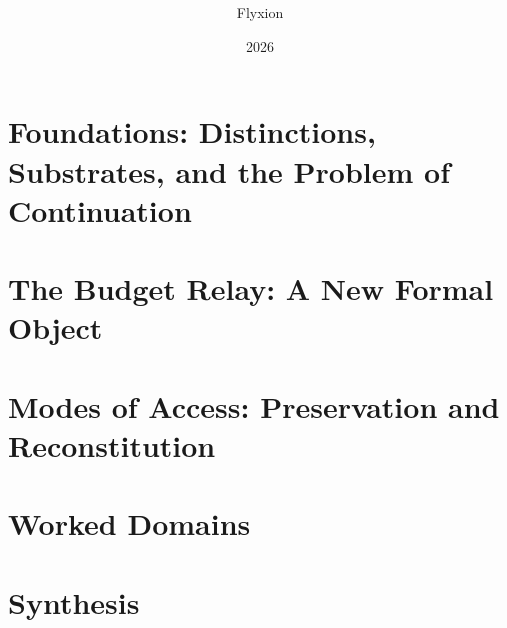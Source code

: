 \documentclass[11pt,twoside,openright]{book}
\title{\booktitle\\\large \booksubtitle}
\author{Flyxion}
\date{2026}
\begin{document}
\frontmatter
\maketitle




\tableofcontents

\mainmatter

\part{Foundations: Distinctions, Substrates, and the Problem of Continuation}
\label{part:foundations}






\part{The Budget Relay: A New Formal Object}
\label{part:budget-relay}





\part{Modes of Access: Preservation and Reconstitution}
\label{part:modes-of-access}




\part{Worked Domains}
\label{part:worked-domains}









\part{Synthesis}
\label{part:synthesis}


\appendix







\backmatter

\printindex
\end{document}

